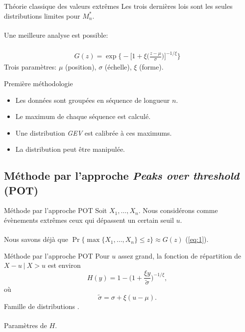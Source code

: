 \documentclass[aspectratio=169, 12pt, french]{beamer}
\begin{document}
\begin{frame}{Théorie classique des valeurs extrêmes}
Les trois dernières lois sont les seules distributions limites pour $M^*_n$. \\~\\ \pause
Une meilleure analyse est possible:\\~\\
\begin{equation}  \label{eq:1}
\begin{gathered}
G(z) = \exp \Bigg\{ - \Big[ 1 +\xi\Big(\frac{z-\mu}{\sigma}\Big) \Big]^{-1/\xi}  \Bigg\}
\end{gathered}
\end{equation} 
Trois paramètres: $\mu$ (position), $\sigma$ (échelle), $\xi$ (forme).
\end{frame}

\begin{frame}{Première méthodologie}
\begin{itemize}
\item Les données sont groupées en séquence de longueur $n$. \pause
\item Le maximum de chaque séquence est calculé. \pause
\item Une distribution \textit{GEV} est calibrée à ces maximums. \pause
\item La distribution peut être manipulée.
\end{itemize}
\end{frame}


\subsection{Méthode par l'approche \protect\textit{Peaks over threshold} (POT)}
\begin{frame}{Méthode par l'approche POT}
Soit $X_1,\dots, X_n$. Nous considérons comme évènements extrêmes ceux qui dépassent un certain seuil $u$.\\~\\
Nous savons déjà que $\Pr\{ \max\{X_1,\dots,X_n\} \le z \}\approx G(z)$ (\ref{eq:1}).
\end{frame}

\begin{frame}{Méthode par l'approche POT}
Pour $u$ assez grand, la fonction de répartition de $X-u\ |\ X>u$ est environ
\begin{equation}
H(y) = 1 - \Big(1+\frac{\xi y}{\tilde\sigma}\Big)^{-1/\xi},
\end{equation}
où
\begin{equation*}
{\tilde{\sigma} = \sigma + \xi(u-\mu)}.
\end{equation*} \pause
Famille de distributions .\\~\\
Paramètres de $H$. 
\end{frame}
\end{document}
